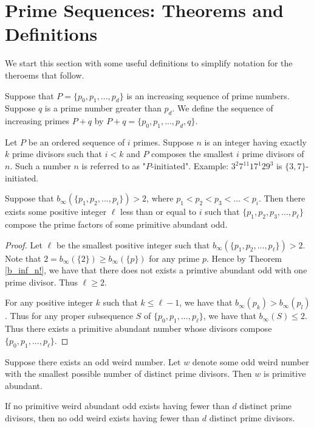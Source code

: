 \documentclass[../paper.tex]{subfiles}
\begin{document}
\section{Prime Sequences: Theorems and Definitions}

We start this section with some useful definitions to simplify
notation for the theroems that follow.

Suppose that $P = \{p_0, p_1, ..., p_d\}$ is an increasing 
sequence of prime numbers. Suppose $q$ is a prime number greater
than $p_d$. We define the sequence of increasing primes $P + q$
by $P + q = \{p_0, p_1, ..., p_d, q\}$.

Let $P$ be an
ordered sequence of $i$ primes. Suppose $n$ is an integer having 
exactly $k$ prime divisors such that $i < k$ and $P$ composes the
smallest $i$ prime divisors of $n$. Such a number $n$ is referred 
to as "$P$-initiated". Example: $3^2 7^{11} 17^1 29^3$ is $\{3,
7\}$-initiated.

\begin{theorem} \label{Primechops}
Suppose that $b_{\infty}(\{p_1,p_2, ..., p_i\}) > 2$,
where $p_1 < p_2 < p_3 < ... < p_i$. Then there exists some
positive integer $\ell$ less than or equal to $i$ such that 
$\{p_1, p_2, p_3, ..., p_\ell\}$ compose the prime factors of
some primitive abundant odd.
\end{theorem}

\begin{proof}
Let $\ell$ be the smallest positive integer such that 
$b_{\infty}(\{p_1, p_2, ..., p_\ell\}) > 2$. Note that
$2 = b_{\infty}(\{2\}) \geq b_{\infty}(\{p\})$ for any prime $p$.
Hence by Theorem {\ref{b_inf_n!}}, we have that there does not exists a
primtive abundant odd with one prime divisor. Thus $\ell \geq 2$.

For any positive integer $k$ such that $k \leq \ell - 1$, we have
that $b_{\infty}(p_k) > b_{\infty}(p_l)$. Thus for any proper 
subsequence $S$ of $\{p_0, p_1, ..., p_{\ell}\}$, we have that 
$b_{\infty}(S) \leq 2$. Thus there exists a primitive abundant
number whose divisors compose $\{p_0, p_1, ..., p_{\ell}\}$.
\end{proof}

\begin{theorem} Suppose there exists an odd weird number. Let $w$
denote some odd weird number with the smallest possible number of
distinct prime divisors. Then $w$ is primitive abundant.
\end{theorem}

\begin{coro} If no primitive weird abundant odd exists
having fewer than $d$ distinct prime divisors, then no odd weird
exists having fewer than $d$ distinct prime divisors.
\end{coro}
\end{document}
